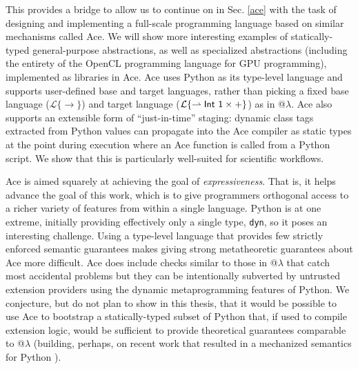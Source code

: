 This provides a bridge to allow us to continue on in Sec. \ref{ace} with the task of designing and implementing a full-scale programming language based on similar mechanisms called Ace. We will show more interesting examples of statically-typed general-purpose abstractions, as well as specialized abstractions (including the entirety of the OpenCL programming language for GPU programming), implemented as libraries in Ace. Ace  uses Python as its type-level language and supports user-defined base and target languages, rather than picking a fixed base language ($\mathcal{L}\{\rightarrow\}$) and target language ($\mathcal{L}\{\rightharpoonup {\sf Int}~\textsf{1} \times{+}\}$) as in @$\lambda$. Ace also supports an extensible form of ``just-in-time'' staging: dynamic class tags extracted from Python values can propagate into the Ace compiler as static types at the point during execution where an Ace function is called from a Python script. We show that this is particularly well-suited for scientific workflows.%

Ace is aimed squarely at achieving the goal of \emph{expressiveness}. That is, it helps advance the goal of this work, which is to give programmers orthogonal access to a richer variety of features from within a single   language. Python is at one extreme, initially providing effectively only a single type, \texttt{dyn}, so it poses an interesting challenge. Using a type-level language that provides few strictly enforced semantic guarantees makes giving strong metatheoretic guarantees about Ace more difficult. Ace does include checks similar to those in @$\lambda$ that catch most accidental problems but they can be intentionally subverted by untrusted extension providers using the dynamic metaprogramming features of Python. We conjecture, but do not plan to show in this thesis, that it would be possible to use Ace to bootstrap a statically-typed subset of Python that, if used to compile extension logic, would be sufficient to provide theoretical guarantees comparable to @$\lambda$ (building, perhaps, on recent work that resulted in a mechanized semantics for Python \cite{pysem}).


